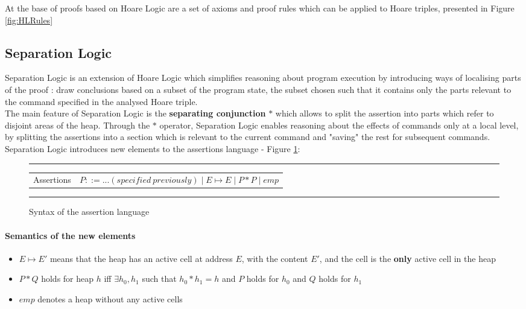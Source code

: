 \documentclass[12pt,a4paper]{article}
\begin{document}
At the base of proofs based on Hoare Logic are a set of axioms and proof rules which can be applied to Hoare triples, presented in Figure \ref{fig:HLRules}

\subsection{Separation Logic}
Separation Logic is an extension of Hoare Logic which simplifies reasoning about program execution by introducing ways of localising parts of the proof : draw conclusions based on a subset of the program state, the subset chosen such that it contains only the parts relevant to the command specified in the analysed Hoare triple. \\

The main feature of Separation Logic is the \textbf{separating conjunction} \(*\) which allows to split the assertion into parts which refer to disjoint areas of the heap. Through the \(*\) operator, Separation Logic enables reasoning about the effects of commands only at a local level, by splitting the assertions into a section which is relevant to the current command and "saving" the rest for subsequent commands. \\

Separation Logic introduces new elements to the assertions language - Figure \ref{fig:SLassertionSyntax}:  \\

\begin{figure}
	\noindent\rule{\linewidth}{0.4pt}
	\begin{tabularx}{\linewidth}{l  X}
		Assertions& \(P ::= ... (specified\ previously) \mid E \mapsto E \mid P * P \mid emp \) \\
	\end{tabularx}
	\caption{Syntax of the assertion language}
	\label{fig:SLassertionSyntax}
	\noindent\rule{\linewidth}{0.4pt}
\end{figure}

\paragraph{Semantics of the new elements}
\begin{itemize}
	\item{\(E \mapsto E\prime \) means that the heap has an active cell at address \(E\), with the content \(E\prime\), and the cell is the \textbf{only} active cell in the heap}
	\item{\(P * Q\) holds for heap \(h\) iff \(\exists h_0,h_1\) such that \(h_0 * h_1 = h\) and \(P\) holds for \(h_0\) and \(Q\) holds for \(h_1\)}
	\item{\(emp\) denotes a heap without any active cells}
\end{itemize}
\end{document}
